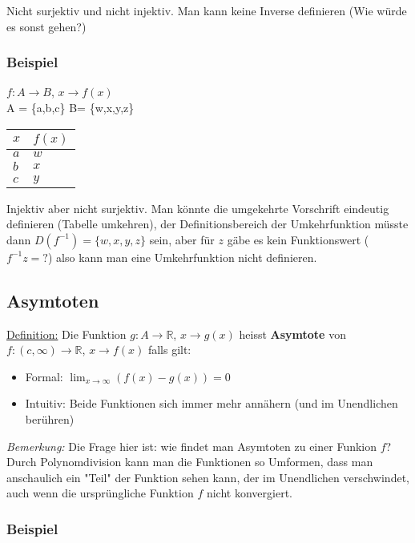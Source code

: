 \documentclass[11pt]{article} %
\begin{document}
Nicht surjektiv und nicht injektiv. Man kann keine Inverse definieren (Wie würde es sonst gehen?)

\subsubsection{Beispiel}
$f: A \rightarrow B$, $x \rightarrow f(x)$\\
A = \{a,b,c\}
B= \{w,x,y,z\}

\begin{table}[h!]
    \begin{tabular}{|l|l|}
        \hline
        $x$ & $f(x)$ \\ \hline
        $a$ & $w$    \\ 
        $b$ & $x$    \\ 
        $c$ & $y$    \\ 
        
        \hline
    \end{tabular}
\end{table}

Injektiv aber nicht surjektiv. Man könnte die umgekehrte Vorschrift eindeutig definieren (Tabelle umkehren), der 
Definitionsbereich der Umkehrfunktion müsste dann $D(f^{-1}) = \{w,x,y,z\}$ sein, aber für $z$ gäbe es kein Funktionswert ($f^{-1}{z} = ?$) also kann man eine Umkehrfunktion nicht definieren.

\subsection{Asymtoten}

\underline{Definition:} Die Funktion $g: A \rightarrow \mathbb{R}$, $x \rightarrow g(x)$ heisst {\bf Asymtote} von $f: (c, \infty) \rightarrow \mathbb{R}$, $x \rightarrow f(x)$ falls gilt:
\begin{itemize}
\item Formal: $\lim_{x \rightarrow \infty} (f(x) - g(x)) = 0$
\item Intuitiv: Beide Funktionen sich immer mehr annähern (und im Unendlichen berühren)
\end{itemize}

\emph{Bemerkung:} Die Frage hier ist: wie findet man Asymtoten zu einer Funkion $f$? Durch Polynomdivision kann man die Funktionen so Umformen, dass man anschaulich ein "Teil" der Funktion sehen kann, der im Unendlichen verschwindet, auch wenn die ursprüngliche Funktion $f$ nicht konvergiert.

\subsubsection{Beispiel}
\end{document}

